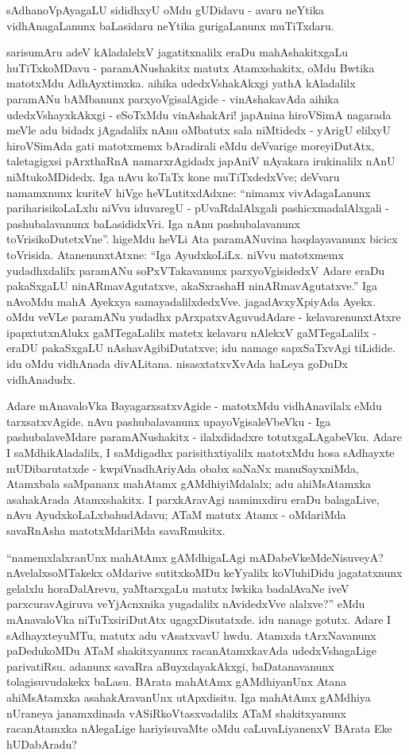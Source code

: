 sAdhanoVpAyagaLU sididhxyU oMdu gUDidavu - avaru neYtika vidhAna\-gaLanunx baLasidaru neYtika gurigaLanunx muTiTxdaru.

sarisumAru adeV kAladalelxV jagatitxnalilx eraDu mahAshakitxgaLu huTiTxkoMDavu - paramANushakitx matutx Atamxshakitx, oMdu Bwtika matotxMdu AdhAyxtimxka. aihika udedxVshakAkxgi yathA kAladalilx paramANu bAMbanunx parxyoVgisalAgide - vinAshakavAda aihika udedxVshayxkAkxgi - eSoTxMdu vinAshakAri! japAnina hiroVSimA nagarada meVle adu bidadx jAgadalilx nAnu oMbatutx sala niMtidedx - yArigU elilxyU hiroVSimAda gati matotxmemx bAradirali eMdu deVvarige moreyiDutAtx, taletagigxsi pArxthaRnA namarxrAgidadx japAniV nAyakara irukinalilx nAnU niMtukoMDidedx. Iga nAvu koTaTx kone muTiTxdedxVve; deVvaru namamxnunx kuriteV hiVge heVLutitxdAdxne: ``nimamx vivAdagaLanunx pariharisikoLaLxlu niVvu iduvaregU - pUvaRdalAlxgali pashicxmadalAlxgali - pashubalavanunx baLasididxVri. Iga nAnu pashubalavanunx toVrisikoDutetxVne''. higeMdu heVLi Ata paramANuvina haqdayavanunx bicicx toVrisida. AtanenunxtAtxne: ``Iga AyudxkoLiLx. niVvu matotxmemx yudadhxdalilx paramANu soPxVTakavanunx parxyoVgisidedxV Adare eraDu pakaSxgaLU ninARmavAgutatxve, akaSxrashaH ninARmavAgutatxve.'' Iga nAvoMdu mahA Ayekxya samayadalilxdedxVve. jagadAvxyXpiyAda Ayekx. oMdu veVLe paramANu yudadhx pArxpatxvAguvudAdare - kelavarenunxtAtxre ipapxtutxnAlukx gaMTegaLalilx matetx kelavaru nAlekxV gaMTegaLalilx - eraDU pakaSxgaLU nAshavAgibiDutatxve; idu namage sapxSaTxvAgi tiLidide. idu oMdu vidhAnada divALitana. nisasxtatxvXvAda haLeya goDuDx vidhAnadudx.

Adare mAnavaloVka BayagarxsatxvAgide - matotxMdu vidhAnavilalx eMdu tarxsatxvAgide. nAvu pashubalavanunx upayoVgisaleVbeVku - Iga pashubalaveMdare paramANushakitx - ilalxdidadxre totutxgaLAgabeVku. Adare I saMdhikAladalilx, I saMdigadhx parisithxtiyalilx matotxMdu hosa sAdhayxte mUDibarutatxde - kwpiVnadhAriyAda obabx saNaNx manuSayxniMda, Atamxbala saMpananx mahAtamx gAMdhiyiMdalalx; adu ahiMsAtamxka asahakArada Atamxshakitx. I parxkAravAgi namimxdiru eraDu balagaLive, nAvu AyudxkoLaLxbahudAdavu; ATaM matutx Atamx - oMdariMda savaRnAsha matotxMdariMda savaRmukitx.

``namemxlalxranUnx mahAtAmx gAMdhigaLAgi mADabeVkeMdeNisuveyA? nAvelalx\break soMTakekx oMdarive sutitxkoMDu keYyalilx koVluhiDidu jagatatxnunx gelalxlu horaDa\-lArevu, yaMtarxgaLu matutx lwkika badalAvaNe iveV parxcuravAgiruva veYjAcnxnika yugadalilx nAvidedxVve alalxve?'' eMdu mAnavaloVka niTuTxsiriDutAtx ugagxDisutatxde. idu nanage gotutx. Adare I sAdhayxteyuMTu, matutx adu vAsatxvavU hwdu. Atamxda tArxNavanunx paDedukoMDu ATaM shakitxyanunx racanAtamxkavAda udedxVshagaLige parivatiRsu. adanunx savaRra aBuyxdayakAkxgi, baDatanavanunx tolagisuvudakekx baLasu. BArata mahAtAmx gAMdhiyanUnx Atana ahiMsAtamxka asahakAravanUnx utApxdisitu. Iga mahAtAmx gAMdhiya nUraneya janamxdinada vASiRkoVtasxvadalilx ATaM shakitxyanunx racanAtamxka nAlegaLige hariyisuvaMte oMdu caLuvaLiyanenxV BArata Eke hUDabAradu?


